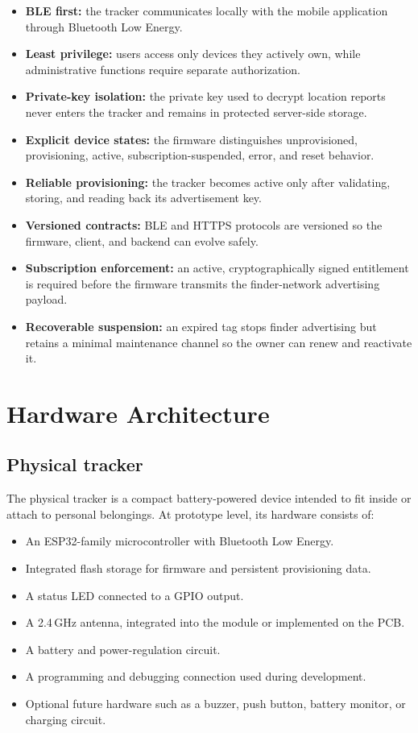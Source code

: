 \documentclass[12pt,a4paper]{article}
\begin{document}
\begin{itemize}
    \item \textbf{BLE first:} the tracker communicates locally with the mobile
    application through Bluetooth Low Energy.
    \item \textbf{Least privilege:} users access only devices they actively own,
    while administrative functions require separate authorization.
    \item \textbf{Private-key isolation:} the private key used to decrypt
    location reports never enters the tracker and remains in protected
    server-side storage.
    \item \textbf{Explicit device states:} the firmware distinguishes
    unprovisioned, provisioning, active, subscription-suspended, error, and
    reset behavior.
    \item \textbf{Reliable provisioning:} the tracker becomes active only after
    validating, storing, and reading back its advertisement key.
    \item \textbf{Versioned contracts:} BLE and HTTPS protocols are versioned so
    the firmware, client, and backend can evolve safely.
    \item \textbf{Subscription enforcement:} an active, cryptographically signed
    entitlement is required before the firmware transmits the finder-network
    advertising payload.
    \item \textbf{Recoverable suspension:} an expired tag stops finder
    advertising but retains a minimal maintenance channel so the owner can
    renew and reactivate it.
\end{itemize}

\section{Hardware Architecture}

\subsection{Physical tracker}

The physical tracker is a compact battery-powered device intended to fit inside
or attach to personal belongings. At prototype level, its hardware consists of:

\begin{itemize}
    \item An ESP32-family microcontroller with Bluetooth Low Energy.
    \item Integrated flash storage for firmware and persistent provisioning
    data.
    \item A status LED connected to a GPIO output.
    \item A 2.4\,GHz antenna, integrated into the module or implemented on the
    PCB.
    \item A battery and power-regulation circuit.
    \item A programming and debugging connection used during development.
    \item Optional future hardware such as a buzzer, push button, battery
    monitor, or charging circuit.
\end{itemize}
\end{document}
